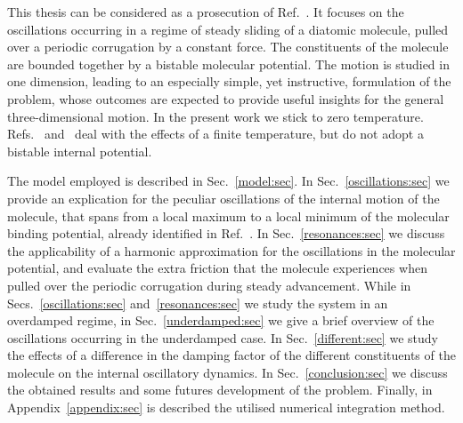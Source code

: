 This thesis can be considered as a prosecution of Ref.~\cite{Cavallini}. It focuses on the oscillations occurring in a regime of steady sliding of a diatomic molecule, pulled over a periodic corrugation by a constant force. The constituents of the molecule are bounded together by a bistable molecular potential. The motion is studied in one dimension, leading to an especially simple, yet instructive, formulation of the problem, whose outcomes are expected to provide useful insights for the general three-dimensional motion. In the present work we stick to zero temperature. Refs.~\cite{Fusco} and~\cite{Fasolino} deal with the effects of a finite temperature, but do not adopt a bistable internal potential. 

The model employed is described in Sec.~\ref{model:sec}. In Sec.~\ref{oscillations:sec} we provide an explication for the peculiar oscillations of the internal motion of the molecule, that spans from a local maximum to a local minimum of the molecular binding potential, already identified in Ref.~\cite{Cavallini}. In Sec.~\ref{resonances:sec} we discuss the applicability of a harmonic approximation for the oscillations in the molecular potential, and evaluate the extra friction that the molecule experiences when pulled over the periodic corrugation during steady advancement. While in Secs.~\ref{oscillations:sec} and~\ref{resonances:sec} we study the system in an overdamped regime, in Sec.~\ref{underdamped:sec} we give a brief overview of the oscillations occurring in the underdamped case. In Sec.~\ref{different:sec} we study the effects of a difference in the damping factor of the different constituents of the molecule on the internal oscillatory dynamics. In Sec.~\ref{conclusion:sec} we discuss the obtained results and some futures development of the problem. Finally, in Appendix~\ref{appendix:sec} is described the utilised numerical integration method.